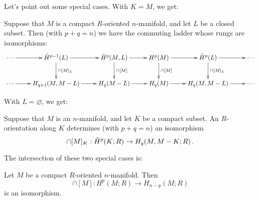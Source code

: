 Let's point out some special cases. With $K=M$, we get: 
\begin{corollary}
Suppose that $M$ is a compact $R$-oriented $n$-manifold, and let $L$ be a 
closed subset. Then (with $p+q=n$) we have the commuting ladder whose rungs
are isomorphisms:
\[
\xymatrix{
\cdots \ar[r] & \cHH^{p-1}(L) \ar[d]^{\cap[M]_L} \ar[r] & 
\cHH^p(M,L) \ar[d]^{\cap[M]} \ar[r] & 
H^p(M) \ar[d]^{\cap[M]} \ar[r] & 
\cHH^p(L) \ar[d]^{\cap[M]_L} \ar[r] & \cdots \\
\cdots \ar[r] & H_{q+1}(M,M-L) \ar[r] & H_q(M-L) \ar[r] & 
H_q(M) \ar[r] & H_q(M,M-L) \ar[r] & \cdots 
}\]
\end{corollary}
With $L=\varnothing$, we get:
\begin{corollary} 
Suppose that $M$ is an $n$-manifold, and let $K$ be a compact subset. 
An $R$-orientation along $K$ determines (with $p+q=n$) an isomorphism
\[
\cap[M]_K:\check{H}^p(K;R)\to H_q(M,M-K;R)\,.
\]
\end{corollary}
The intersection of these two special cases is:
\begin{corollary} 
Let $M$ be a compact $R$-oriented $n$-manifold. Then 
\[
\cap[M]:H^p(M;R)\to H_{n-p}(M;R)
\]
is an isomorphism.
\end{corollary}

